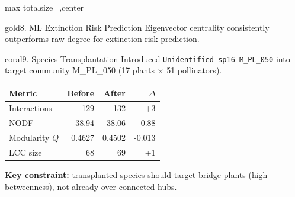 \documentclass[10pt]{article}
\begin{document}
\begin{adjustbox}{max totalsize={\textwidth}{\textheight},center}
\begin{minipage}{\textwidth}
\begin{minipage}[t]{0.327\textwidth}
\begin{card}{gold}{8. ML Extinction Risk Prediction}
Eigenvector centrality consistently outperforms raw degree for extinction risk prediction.
\end{card}

\vspace{1.0mm}
\begin{card}{coral}{9. Species Transplantation}
Introduced \texttt{Unidentified sp16 M\_PL\_050} into target community M\_PL\_050 (17 plants $\times$ 51 pollinators).

\footnotesize
\begin{tabularx}{\linewidth}{@{}lrrr@{}}
\toprule
Metric & Before & After & $\Delta$ \\
\midrule
Interactions & 129 & 132 & +3 \\
NODF & 38.94 & 38.06 & -0.88 \\
Modularity $Q$ & 0.4627 & 0.4502 & -0.013 \\
LCC size & 68 & 69 & +1 \\
\bottomrule
\end{tabularx}

\textbf{Key constraint:} transplanted species should target bridge plants (high betweenness), not already over-connected hubs.
\end{card}

\end{minipage}

\vspace{1.4mm}


\end{minipage}
\end{adjustbox}
\end{document}
